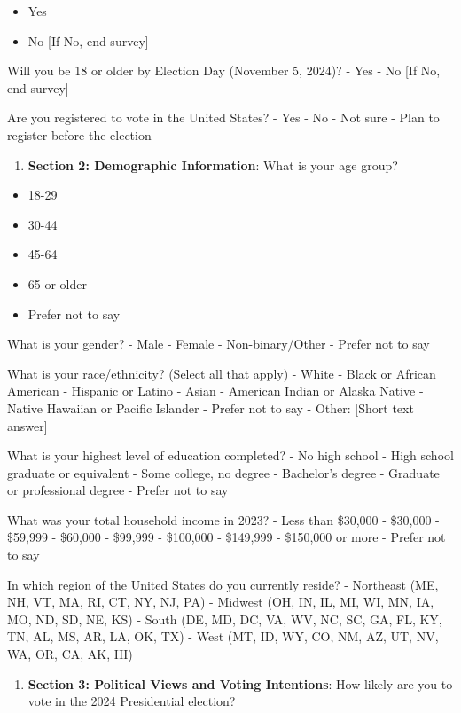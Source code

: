 \documentclass[
  letterpaper,
  DIV=11,
  numbers=noendperiod]{scrartcl}
\providecommand{\tightlist}{%
  \setlength{\itemsep}{0pt}\setlength{\parskip}{0pt}}\usepackage{longtable,booktabs,array}
\begin{document}
\begin{itemize}
\tightlist
\item
  Yes
\item
  No {[}If No, end survey{]}
\end{itemize}

Will you be 18 or older by Election Day (November 5, 2024)? - Yes - No
{[}If No, end survey{]}

Are you registered to vote in the United States? - Yes - No - Not sure -
Plan to register before the election

\begin{enumerate}
\def\labelenumi{\arabic{enumi}.}
\setcounter{enumi}{2}
\tightlist
\item
  \textbf{Section 2: Demographic Information}: What is your age group?
\end{enumerate}

\begin{itemize}
\tightlist
\item
  18-29
\item
  30-44
\item
  45-64
\item
  65 or older
\item
  Prefer not to say
\end{itemize}

What is your gender? - Male - Female - Non-binary/Other - Prefer not to
say

What is your race/ethnicity? (Select all that apply) - White - Black or
African American - Hispanic or Latino - Asian - American Indian or
Alaska Native - Native Hawaiian or Pacific Islander - Prefer not to say
- Other: {[}Short text answer{]}

What is your highest level of education completed? - No high school -
High school graduate or equivalent - Some college, no degree -
Bachelor's degree - Graduate or professional degree - Prefer not to say

What was your total household income in 2023? - Less than \$30,000 -
\$30,000 - \$59,999 - \$60,000 - \$99,999 - \$100,000 - \$149,999 -
\$150,000 or more - Prefer not to say

In which region of the United States do you currently reside? -
Northeast (ME, NH, VT, MA, RI, CT, NY, NJ, PA) - Midwest (OH, IN, IL,
MI, WI, MN, IA, MO, ND, SD, NE, KS) - South (DE, MD, DC, VA, WV, NC, SC,
GA, FL, KY, TN, AL, MS, AR, LA, OK, TX) - West (MT, ID, WY, CO, NM, AZ,
UT, NV, WA, OR, CA, AK, HI)

\begin{enumerate}
\def\labelenumi{\arabic{enumi}.}
\setcounter{enumi}{3}
\tightlist
\item
  \textbf{Section 3: Political Views and Voting Intentions}: How likely
  are you to vote in the 2024 Presidential election?
\end{enumerate}
\end{document}
